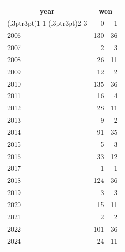 \footnotesize\begin{tabular}[t]{lrr}
\toprule
\multicolumn{1}{c}{year} & \multicolumn{2}{c}{won} \\
\cmidrule(l{3pt}r{3pt}){1-1} \cmidrule(l{3pt}r{3pt}){2-3}
  & 0 & 1\\
\midrule
2006 & 130 & 36\\
2007 & 2 & 3\\
2008 & 26 & 11\\
2009 & 12 & 2\\
2010 & 135 & 36\\
2011 & 16 & 4\\
2012 & 28 & 11\\
2013 & 9 & 2\\
2014 & 91 & 35\\
2015 & 5 & 3\\
2016 & 33 & 12\\
2017 & 1 & 1\\
2018 & 124 & 36\\
2019 & 3 & 3\\
2020 & 15 & 11\\
2021 & 2 & 2\\
2022 & 101 & 36\\
2024 & 24 & 11\\
\bottomrule
\end{tabular}
